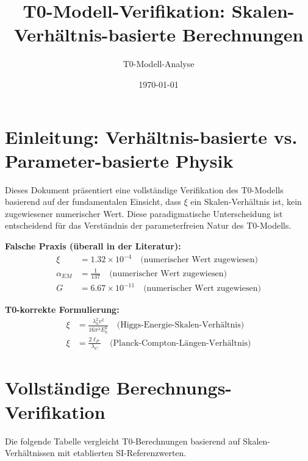 \documentclass[12pt,a4paper]{article}
\title{T0-Modell-Verifikation: Skalen-Verhältnis-basierte Berechnungen}
\author{T0-Modell-Analyse}
\date{\today}
\begin{document}
	
	\maketitle
	
	\section{Einleitung: Verhältnis-basierte vs. Parameter-basierte Physik}
	
	Dieses Dokument präsentiert eine vollständige Verifikation des T0-Modells basierend auf der fundamentalen Einsicht, dass $\xi$ ein Skalen-Verhältnis ist, kein zugewiesener numerischer Wert. Diese paradigmatische Unterscheidung ist entscheidend für das Verständnis der parameterfreien Natur des T0-Modells.
	
	\begin{tcolorbox}[colback=red!5!white,colframe=red!75!black,title=Fundamentaler Literatur-Fehler]
		\textbf{Falsche Praxis (überall in der Literatur):}
		\begin{align}
			\xi &= 1.32 \times 10^{-4} \quad \text{(numerischer Wert zugewiesen)} \\
			\alpha_{EM} &= \frac{1}{137} \quad \text{(numerischer Wert zugewiesen)} \\
			G &= 6.67 \times 10^{-11} \quad \text{(numerischer Wert zugewiesen)}
		\end{align}
		
		\textbf{T0-korrekte Formulierung:}
		\begin{align}
			\xi &= \frac{\lambda_h^2 v^2}{16\pi^3 E_h^2} \quad \text{(Higgs-Energie-Skalen-Verhältnis)} \\
			\xi &= \frac{2\ell_P}{\lambda_C} \quad \text{(Planck-Compton-Längen-Verhältnis)}
		\end{align}
	\end{tcolorbox}
	
	\section{Vollständige Berechnungs-Verifikation}
	
	Die folgende Tabelle vergleicht T0-Berechnungen basierend auf Skalen-Verhältnissen mit etablierten SI-Referenzwerten.
	
\end{document}
